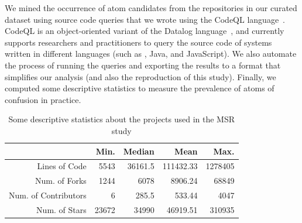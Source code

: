 We mined the occurrence of atom candidates from the repositories in our curated dataset using source code queries that we wrote using the CodeQL language~\cite{moor:gttse2007}. CodeQL is an object-oriented variant of the Datalog language~\cite{rodriguez2020efficient}, and currently supports researchers and practitioners to query the source code of systems written in different languages (such as \cpplang, Java, and JavaScript). We also automate the process of running the queries and exporting the results to a format that simplifies our analysis (and also the reproduction of this study). Finally, we computed some descriptive statistics to measure the prevalence of atoms of confusion in practice. 

\begin{table}[ht]
  \centering
   \caption{Some descriptive statistics about the projects used in the MSR study}
  \begin{scriptsize}
 \begin{tabular}{rrrrr}
   \hline
                       & Min.             & Median        & Mean             & Max. \\ \hline
 Lines of Code         & \num{5543}       & \num{36161.5} & \num{111432.33}  & \num{1278405} \\
 Num. of Forks         & \num{1244}       & \num{6078}    & \num{8906.24}    & \num{68849} \\
 Num. of Contributors  & \num{6}          & \num{285.5}   & \num{533.44}     & \num{4047} \\
 Num. of Stars         & \num{23672}      & \num{34990}   & \num{46919.51}   & \num{310935} \\
 
    \hline
 \end{tabular}
 \end{scriptsize}
 \label{tab:projects-statistics} 
 \end{table}


